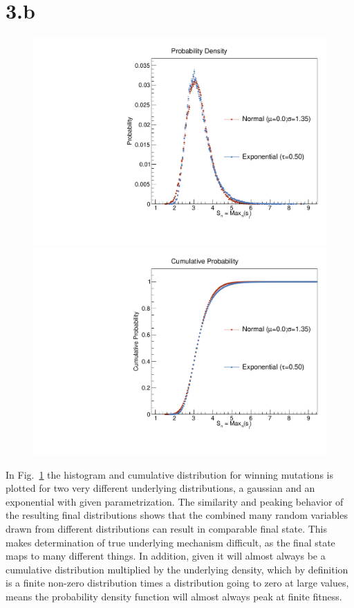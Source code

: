 \documentclass{article}
\begin{document}
\section{3.b}

\begin{figure}[H]
    \centering
    \includegraphics[width=.45\textwidth]{simulate_20171201.pdf} 
    \includegraphics[width=.45\textwidth]{simulate_Cumulative_20171201.pdf} 
    \caption{}
    \label{fig:fig5}
\end{figure}

In Fig.~\ref{fig:fig5} the histogram and cumulative distribution for winning mutations is plotted for two very different underlying distributions, a gaussian and an exponential with given parametrization. The similarity and peaking behavior of the resulting final distributions shows that the combined many random variables drawn from different distributions can result in comparable final state. This makes determination of true underlying mechanism difficult, as the final state maps to many different things. In addition, given it will almost always be a cumulative distribution multiplied by the underlying density, which by definition is a finite non-zero distribution times a distribution going to zero at large values, means the probability density function will almost always peak at finite fitness.
\end{document}

